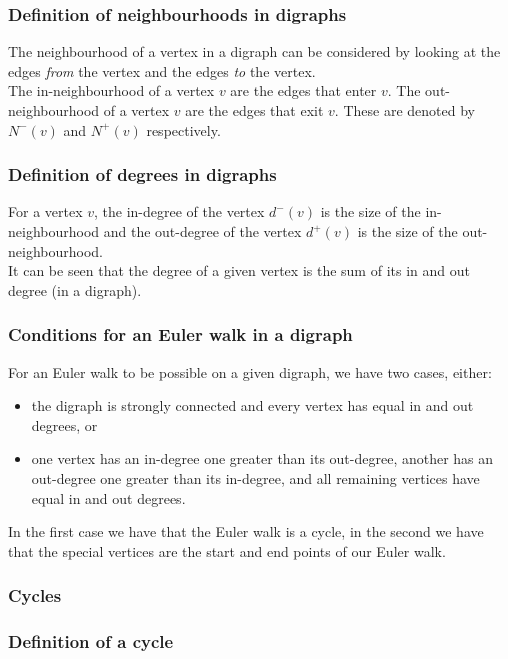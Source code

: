 \documentclass[a4paper, 12pt, twoside]{article}
\begin{document}
\subsubsection{Definition of neighbourhoods in digraphs}

The neighbourhood of a vertex in a digraph can be considered by
looking at the edges \textit{from} the vertex and the edges
\textit{to} the vertex.
\\[\baselineskip]
The in-neighbourhood of a vertex $v$ are the edges that enter $v$.
The out-neighbourhood of a vertex $v$ are the edges that exit $v$.
These are denoted by $N^-(v)$ and $N^+(v)$ respectively.

\subsubsection{Definition of degrees in digraphs}

For a vertex $v$, the in-degree of the vertex $d^-(v)$ is the size of
the in-neighbourhood and the out-degree of the vertex $d^+(v)$
is the size of the out-neighbourhood.
\\[\baselineskip]
It can be seen that the degree of a given vertex is the sum of
its in and out degree (in a digraph).

\subsubsection{Conditions for an Euler walk in a digraph}

For an Euler walk to be possible on a given digraph, we have
two cases, either:\begin{itemize}
  \item the digraph is strongly connected and every vertex
  has equal in and out degrees, or
  \item one vertex has an in-degree one greater than its out-degree,
  another has an out-degree one greater than its in-degree, and all
  remaining vertices have equal in and out degrees.
\end{itemize}
In the first case we have that the Euler walk is a cycle, 
in the second we have that the special vertices are the start and end
points of our Euler walk. 

\subsubsection{Cycles}

\subsubsection{Definition of a cycle}
\end{document}
